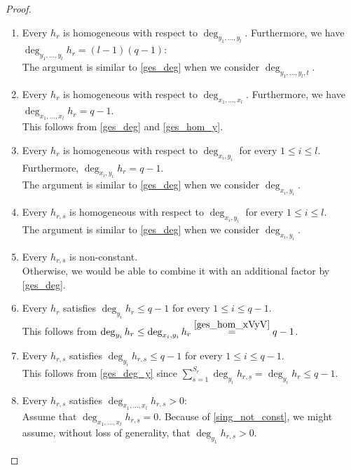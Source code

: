 \documentclass[reqno]{amsart}
\theoremstyle{definition}
\theoremstyle{plain}
\begin{document}
\begin{proof}
\begin{enumerate}
	\item \label{ges_hom_y} Every $h_r$ is homogeneous with respect to $\deg_{y_1, \dots, y_{l}}$. Furthermore, we have $\deg_{y_1, \dots, y_{l}} h_r = (l-1)(q-1)$: \\
	The argument is similar to \eqref{ges_deg} when we consider $\deg_{y_1, \dots,y_{l}, t}$.
	\item \label{ges_deg_X} Every $h_r$ is homogeneous with respect to $\deg_{x_1, \dots, x_{l}}$. Furthermore, we have $\deg_{x_1, \dots, x_{l}} h_r = q-1$. \\
	This follows from \eqref{ges_deg} and \eqref{ges_hom_y}.
	\item \label{ges_hom_xVyV} Every $h_{r}$ is homogeneous with respect to $\deg_{x_i, y_i}$ for every $1 \leq i \leq l$. Furthermore, $\deg_{x_i, y_i}h_r = q-1$.\\
	The argument is similar to \eqref{ges_deg} when we consider $\deg_{x_i, y_i}$.
	\item \label{sing_hom_xVyV} Every $h_{r,s}$ is homogeneous with respect to $\deg_{x_i, y_i}$ for every $1 \leq i \leq l$.\\
	The argument is similar to \eqref{ges_deg} when we consider $\deg_{x_i, y_i}$.
	\item \label{sing_not_const} Every $h_{r,s}$ is non-constant. \\
	Otherwise, we would be able to combine it with an additional factor by \eqref{ges_deg}.
	\item \label{ges_deg_y} Every $h_{r}$ satisfies $\deg_{y_i} h_{r}  \leq q-1 $ for every $1 \leq i \leq q-1$.\\
	This follows from $\deg_{y_i} h_{r} \leq \deg_{x_i,y_i} h_{r} \overset{\eqref{ges_hom_xVyV}}{=} q-1 $.
	\item \label{sing_deg_y} Every $h_{r,s}$ satisfies $\deg_{y_i} h_{r,s} \leq q-1 $ for every $1 \leq i \leq q-1$.\\
	This follows from \eqref{ges_deg_y} since $\sum_{s=1}^{S_r} \deg_{y_i} h_{r,s} =\deg_{y_i} h_{r} \leq q-1 $.
	\item \label{sing_deg_x} Every $h_{r,s}$ satisfies $\deg_{x_1, \dots, x_{l}} h_{r,s} >0$:\\
	Assume that $\deg_{x_1, \dots, x_{l}} h_{r,s} =0$. Because of \eqref{sing_not_const}, we might assume, without loss of generality, that $\deg_{y_1} h_{r,s}>0$. 

\end{enumerate}
\end{proof}
\end{document}
